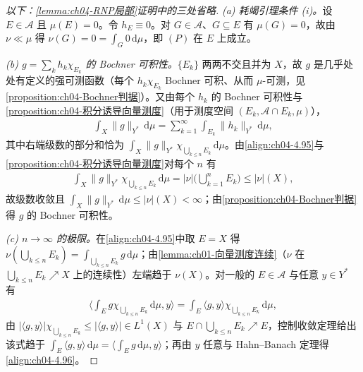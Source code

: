 \documentclass[../../main.tex]{subfiles}%
\begin{document}
\begin{proof}[以下：\cref{lemma:ch04-RNP局部}证明中的三处省略]
\emph{(a) 耗竭引理条件 (i)。}设 $E\in\mathcal{A}$ 且 $\mu(E)=0$。令 $h_E\equiv0$。对 $G\in\mathcal{A}$、$G\subseteq E$ 有 $\mu(G)=0$，故由 $\nu\ll\mu$ 得 $\nu(G)=0=\int_G0\,\mathrm{d}\mu$，即 $(P)$ 在 $E$ 上成立。

\emph{(b) $g=\sum_kh_k\chi_{E_k}$ 的 Bochner 可积性。}$\{E_k\}$ 两两不交且并为 $X$，故 $g$ 是几乎处处有定义的强可测函数（每个 $h_k\chi_{E_k}$ Bochner 可积、从而 $\mu$-可测，见\cref{proposition:ch04-Bochner判据}）。又由每个 $h_k$ 的 Bochner 可积性与\cref{proposition:ch04-积分诱导向量测度}（用于测度空间 $(E_k,\mathcal{A}\cap E_k,\mu)$），
\begin{align*}
\int_X\|g\|_{Y^*}\,\mathrm{d}\mu=\sum_{k=1}^\infty\int_{E_k}\|h_k\|_{Y^*}\,\mathrm{d}\mu,
\end{align*}
其中右端级数的部分和恰为 $\int_X\|g\|_{Y^*}\chi_{\bigcup_{k\leqslant n}E_k}\,\mathrm{d}\mu$。由\eqref{align:ch04-4.95}与\cref{proposition:ch04-积分诱导向量测度}对每个 $n$ 有
\begin{align*}
\int_X\|g\|_{Y^*}\chi_{\bigcup_{k\leqslant n}E_k}\,\mathrm{d}\mu=|\nu|\Big(\bigcup_{k=1}^nE_k\Big)\leqslant|\nu|(X),
\end{align*}
故级数收敛且 $\int_X\|g\|_{Y^*}\,\mathrm{d}\mu\leqslant|\nu|(X)<\infty$；由\cref{proposition:ch04-Bochner判据}得 $g$ 的 Bochner 可积性。

\emph{(c) $n\to\infty$ 的极限。}在\eqref{align:ch04-4.95}中取 $E=X$ 得 $\nu(\bigcup_{k\leqslant n}E_k)=\int_{\bigcup_{k\leqslant n}E_k}g\,\mathrm{d}\mu$；由\cref{lemma:ch01-向量测度连续}（$\nu$ 在 $\bigcup_{k\leqslant n}E_k\nearrow X$ 上的连续性）左端趋于 $\nu(X)$。对一般的 $E\in\mathcal{A}$ 与任意 $y\in Y^*$ 有
\begin{align*}
\Big\langle\int_E g\chi_{\bigcup_{k\leqslant n}E_k}\,\mathrm{d}\mu,y\Big\rangle=\int_E\langle g,y\rangle\chi_{\bigcup_{k\leqslant n}E_k}\,\mathrm{d}\mu,
\end{align*}
由 $|\langle g,y\rangle|\chi_{\bigcup_{k\leqslant n}E_k}\leqslant|\langle g,y\rangle|\in L^1(X)$ 与 $E\cap\bigcup_{k\leqslant n}E_k\nearrow E$，控制收敛定理给出该式趋于 $\int_E\langle g,y\rangle\,\mathrm{d}\mu=\langle\int_Eg\,\mathrm{d}\mu,y\rangle$；再由 $y$ 任意与 Hahn--Banach 定理得\eqref{align:ch04-4.96}。
\end{proof}
\end{document}
